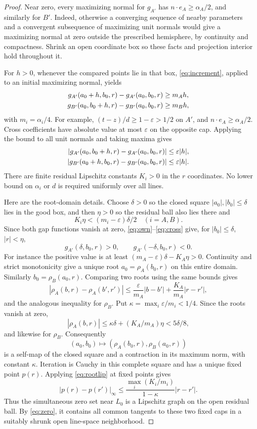 \documentclass[11pt]{article}
\newcommand{\eps}{\varepsilon}
\theoremstyle{remark}
\begin{document}
\begin{proof}
Near zero, every maximizing normal for $g_{A'}$ has $n\cdot e_A\ge\alpha_A/2$, and similarly for $B'$. Indeed, otherwise a converging sequence of nearby parameters and a convergent subsequence of maximizing unit normals would give a maximizing normal at zero outside the prescribed hemisphere, by continuity and compactness. Shrink an open coordinate box so these facts and projection interior hold throughout it.

For $h>0$, whenever the compared points lie in that box, \eqref{eq:increment}, applied to an initial maximizing normal, yields
\begin{align}
g_{A'}(a_0+h,b_0,r)-g_{A'}(a_0,b_0,r)&\ge m_Ah,\label{eq:own}\\
g_{B'}(a_0,b_0+h,r)-g_{B'}(a_0,b_0,r)&\ge m_Bh,\notag
\end{align}
with $m_i=\alpha_i/4$. For example, $(t-z)/d\ge1-\eps>1/2$ on $A'$, and $n\cdot e_A\ge\alpha_A/2$. Cross coefficients have absolute value at most $\eps$ on the opposite cap. Applying the bound to all unit normals and taking maxima gives
\begin{align}
|g_{A'}(a_0,b_0+h,r)-g_{A'}(a_0,b_0,r)|&\le\eps|h|,\label{eq:cross}\\
|g_{B'}(a_0+h,b_0,r)-g_{B'}(a_0,b_0,r)|&\le\eps|h|.\notag
\end{align}
There are finite residual Lipschitz constants $K_i>0$ in the $r$ coordinates. No lower bound on $\alpha_i$ or $d$ is required uniformly over all lines.

Here are the root-domain details. Choose $\delta>0$ so the closed square $|a_0|,|b_0|\le\delta$ lies in the good box, and then $\eta>0$ so the residual ball also lies there and
\[
K_i\eta<(m_i-\eps)\delta/2\quad(i=A,B).
\]
Since both gap functions vanish at zero, \eqref{eq:own}--\eqref{eq:cross} give, for $|b_0|\le\delta$, $|r|<\eta$,
\[
g_{A'}(\delta,b_0,r)>0,\qquad g_{A'}(-\delta,b_0,r)<0.
\]
For instance the positive value is at least $(m_A-\eps)\delta-K_A\eta>0$. Continuity and strict monotonicity give a unique root $a_0=\rho_A(b_0,r)$ on this entire domain. Similarly $b_0=\rho_B(a_0,r)$. Comparing two roots using the same bounds gives
\begin{equation}\label{eq:rootlip}
|\rho_A(b,r)-\rho_A(b',r')|
\le\frac{\eps}{m_A}|b-b'|+\frac{K_A}{m_A}|r-r'|,
\end{equation}
and the analogous inequality for $\rho_B$. Put $\kappa=\max_i\eps/m_i<1/4$. Since the roots vanish at zero,
\[
|\rho_A(b,r)|\le\kappa\delta+(K_A/m_A)\eta<5\delta/8,
\]
and likewise for $\rho_B$. Consequently
\[
(a_0,b_0)\longmapsto(\rho_A(b_0,r),\rho_B(a_0,r))
\]
is a self-map of the closed square and a contraction in its maximum norm, with constant $\kappa$. Iteration is Cauchy in this complete square and has a unique fixed point $p(r)$. Applying \eqref{eq:rootlip} at fixed points gives
\[
|p(r)-p(r')|_\infty
\le\frac{\max_i(K_i/m_i)}{1-\kappa}|r-r'|.
\]
Thus the simultaneous zero set near $L_0$ is a Lipschitz graph on the open residual ball. By \eqref{eq:zero}, it contains all common tangents to these two fixed caps in a suitably shrunk open line-space neighborhood.


\end{proof}
\end{document}
